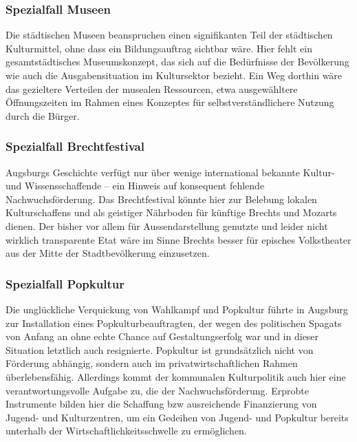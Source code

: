 \documentclass[a5paper, ngerman, 10pt]{scrbook}
\begin{document}
   \subsubsection{Spezialfall Museen}
   
   Die städtischen Museen beanspruchen einen signifikanten Teil der 
   städtischen Kulturmittel, ohne dass ein Bildungsauftrag sichtbar wäre. Hier 
   fehlt ein gesamtstädtisches Museumskonzept, das sich auf die Bedürfnisse 
   der Bevölkerung wie auch die Ausgabensituation im Kultursektor bezieht. Ein 
   Weg dorthin wäre das gezieltere Verteilen der musealen Ressourcen, etwa 
   ausgewähltere Öffnungszeiten im Rahmen eines Konzeptes für 
   selbstverständlichere Nutzung durch die Bürger.
   
   \subsubsection{Spezialfall Brechtfestival}
   
   Augsburgs Geschichte verfügt nur über wenige international bekannte Kultur- 
   und Wissensschaffende – ein Hinweis auf konsequent fehlende 
   Nachwuchsförderung. Das Brechtfestival könnte hier zur Belebung lokalen 
   Kulturschaffens und als geistiger Nährboden für künftige Brechts und 
   Mozarts dienen. Der bisher vor allem für Aussendarstellung genutzte und 
   leider nicht wirklich transparente Etat wäre im Sinne Brechts besser für 
   episches Volkstheater aus der Mitte der Stadtbevölkerung einzusetzen.
   
   \subsubsection{Spezialfall Popkultur}
   
   Die unglückliche Verquickung von Wahlkampf und Popkultur führte in Augsburg 
   zur Installation eines Popkulturbeauftragten, der wegen des politischen 
   Spagats von Anfang an ohne echte Chance auf Gestaltungserfolg war und in 
   dieser Situation letztlich auch resignierte. Popkultur ist grundsätzlich 
   nicht von Förderung abhängig, sondern auch im privatwirtschaftlichen Rahmen 
   überlebensfähig. Allerdings kommt der kommunalen Kulturpolitik auch hier 
   eine verantwortungsvolle Aufgabe zu, die der Nachwuchsförderung. Erprobte 
   Instrumente bilden hier die Schaffung bzw ausreichende Finanzierung von 
   Jugend- und Kulturzentren, um ein Gedeihen von Jugend- und Popkultur 
   bereits unterhalb der Wirtschaftlichkeitsschwelle zu ermöglichen. 
   
\end{document}
